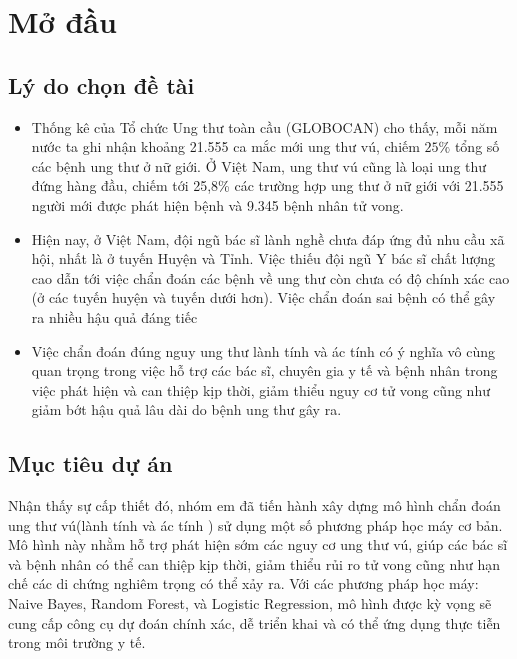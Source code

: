 \section{Mở đầu}
\subsection{Lý do chọn đề tài}
\begin{itemize}
    \item Thống kê của Tổ chức Ung thư toàn cầu (GLOBOCAN) cho thấy, mỗi năm nước ta ghi nhận khoảng 21.555 ca mắc mới ung thư vú, chiếm \(25\% \) tổng số các bệnh ung thư ở nữ giới.
    Ở Việt Nam, ung thư vú cũng là loại ung thư đứng hàng đầu, chiếm tới 25,8\% các trường hợp ung thư ở nữ giới với 21.555 người mới được phát hiện bệnh và 9.345 bệnh nhân tử vong. 
    \item Hiện nay, ở Việt Nam, đội ngũ bác sĩ lành nghề chưa đáp ứng đủ nhu cầu xã hội, nhất là ở tuyến Huyện và Tỉnh. Việc thiếu đội ngũ Y bác sĩ chất lượng cao dẫn tới việc chẩn đoán các bệnh về ung thư còn chưa có độ chính xác cao (ở các tuyến huyện và tuyến dưới hơn). Việc chẩn đoán sai bệnh có thể gây ra nhiều hậu quả đáng tiếc
    \item Việc chẩn đoán đúng nguy ung thư lành tính và ác tính có ý nghĩa vô cùng quan trọng trong việc hỗ trợ các bác sĩ, chuyên gia y tế và bệnh nhân trong việc phát hiện và can thiệp kịp thời, giảm thiểu nguy cơ tử vong cũng như giảm bớt hậu quả lâu dài do bệnh ung thư gây ra.
\end{itemize}



\subsection{Mục tiêu dự án}
Nhận thấy sự cấp thiết đó, nhóm em đã tiến hành xây dựng mô hình chẩn đoán  ung thư vú(lành tính và ác tính )  sử dụng một số phương pháp học máy cơ bản. Mô hình này nhằm hỗ trợ phát hiện sớm các nguy cơ ung thư vú, giúp các bác sĩ và bệnh nhân có thể can thiệp kịp thời, giảm thiểu rủi ro tử vong cũng như hạn chế các di chứng nghiêm trọng có thể xảy ra. Với các phương pháp học máy: Naive Bayes, Random Forest, và Logistic Regression, mô hình được kỳ vọng sẽ cung cấp công cụ dự đoán chính xác, dễ triển khai và có thể ứng dụng thực tiễn trong môi trường y tế.
